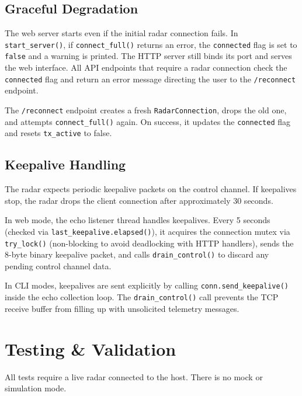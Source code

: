 \documentclass[11pt,letterpaper]{article}
\begin{document}
\subsection{Graceful Degradation}
\label{subsec:graceful-degradation}

The web server starts even if the initial radar connection fails. In \texttt{start\_server()}, if \texttt{connect\_full()} returns an error, the \texttt{connected} flag is set to \texttt{false} and a warning is printed. The HTTP server still binds its port and serves the web interface. All API endpoints that require a radar connection check the \texttt{connected} flag and return an error message directing the user to the \texttt{/reconnect} endpoint.

The \texttt{/reconnect} endpoint creates a fresh \texttt{RadarConnection}, drops the old one, and attempts \texttt{connect\_full()} again. On success, it updates the \texttt{connected} flag and resets \texttt{tx\_active} to false.

\subsection{Keepalive Handling}
\label{subsec:keepalive-handling}

The radar expects periodic keepalive packets on the control channel. If keepalives stop, the radar drops the client connection after approximately 30 seconds.

In web mode, the echo listener thread handles keepalives. Every 5 seconds (checked via \texttt{last\_keepalive.elapsed()}), it acquires the connection mutex via \texttt{try\_lock()} (non-blocking to avoid deadlocking with HTTP handlers), sends the 8-byte binary keepalive packet, and calls \texttt{drain\_control()} to discard any pending control channel data.

In CLI modes, keepalives are sent explicitly by calling \texttt{conn.send\_keepalive()} inside the echo collection loop. The \texttt{drain\_control()} call prevents the TCP receive buffer from filling up with unsolicited telemetry messages.


\newpage
\section{Testing \& Validation}
\label{sec:testing}

All tests require a live radar connected to the host. There is no mock or simulation mode.
\end{document}
